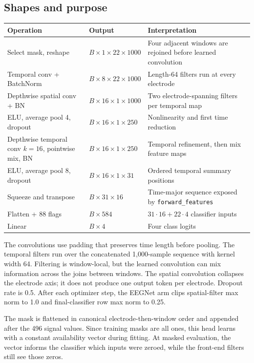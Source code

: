 \documentclass[11pt,a4paper]{article}
\newcommand{\code}[1]{{\small\nolinkurl{#1}}}
\begin{document}
\subsection*{Shapes and purpose}
\begin{tabularx}{\linewidth}{@{}L{45mm}L{34mm}Y@{}}
\toprule
Operation & Output & Interpretation \\
\midrule
Select mask, reshape & $B\times1\times22\times1000$ & Four adjacent windows are rejoined before learned convolution \\
Temporal conv + BatchNorm & $B\times8\times22\times1000$ & Length-64 filters run at every electrode \\
Depthwise spatial conv + BN & $B\times16\times1\times1000$ & Two electrode-spanning filters per temporal map \\
ELU, average pool 4, dropout & $B\times16\times1\times250$ & Nonlinearity and first time reduction \\
Depthwise temporal conv $k=16$, pointwise mix, BN & $B\times16\times1\times250$ & Temporal refinement, then mix feature maps \\
ELU, average pool 8, dropout & $B\times16\times1\times31$ & Ordered temporal summary positions \\
Squeeze and transpose & $B\times31\times16$ & Time-major sequence exposed by \code{forward_features} \\
Flatten + 88 flags & $B\times584$ & $31\cdot16+22\cdot4$ classifier inputs \\
Linear & $B\times4$ & Four class logits \\
\bottomrule
\end{tabularx}

The convolutions use padding that preserves time length before pooling. The
temporal filters run over the concatenated 1,000-sample sequence with kernel
width 64. Filtering is window-local, but the learned convolution can mix
information across the joins between windows. The spatial convolution
collapses the electrode axis; it does not produce one output token per
electrode. Dropout rate is 0.5. After each optimizer step, the EEGNet arm
clips spatial-filter max norm to 1.0 and final-classifier row max norm to 0.25.

The mask is flattened in canonical electrode-then-window order and appended
after the 496 signal values. Since training masks are all ones, this head
learns with a constant availability vector during fitting. At masked
evaluation, the vector informs the classifier which inputs were zeroed, while
the front-end filters still see those zeros.
\end{document}
